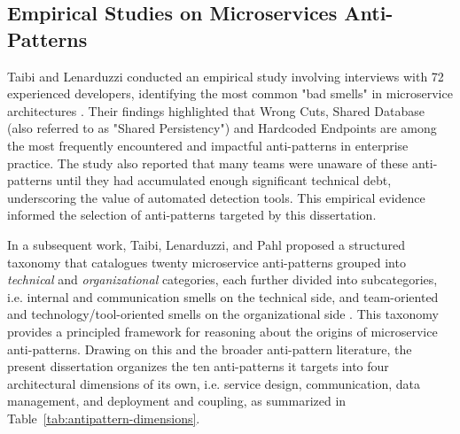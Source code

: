\subsection{Empirical Studies on Microservices Anti-Patterns}
\label{subsec:empirical-studies}

\par Taibi and Lenarduzzi conducted an empirical study involving interviews with 72 experienced developers, identifying the most common "bad smells" in microservice architectures \cite{Taibi2018}. Their findings highlighted that Wrong Cuts, Shared Database (also referred to as "Shared Persistency") and Hardcoded Endpoints are among the most frequently encountered and impactful anti-patterns in enterprise practice. The study also reported that many teams were unaware of these anti-patterns until they had accumulated enough significant technical debt, underscoring the value of automated detection tools. This empirical evidence informed the selection of anti-patterns targeted by this dissertation.

In a subsequent work, Taibi, Lenarduzzi, and Pahl proposed a structured taxonomy that catalogues twenty microservice anti-patterns grouped into \emph{technical} and \emph{organizational} categories, each further divided into subcategories, i.e. internal and communication smells on the technical side, and team-oriented and technology/tool-oriented smells on the organizational side \cite{Taibi2020}. This taxonomy provides a principled framework for reasoning about the origins of microservice anti-patterns. Drawing on this and the broader anti-pattern literature, the present dissertation organizes the ten anti-patterns it targets into four architectural dimensions of its own, i.e. service design, communication, data management, and deployment and coupling, as summarized in Table~\ref{tab:antipattern-dimensions}.

